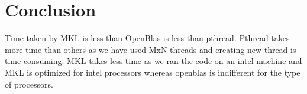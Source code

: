 \documentclass[14pt]{extarticle}
\begin{document}
\section{Conclusion}
Time taken by MKL is less than OpenBlas is less than pthread. Pthread takes more time than others as we have used MxN threads and creating new thread is time consuming. 
MKL takes less time as we ran the code on an intel machine and MKL is optimized for intel processors whereas openblas is indifferent for the type of processors.


\end{document}
